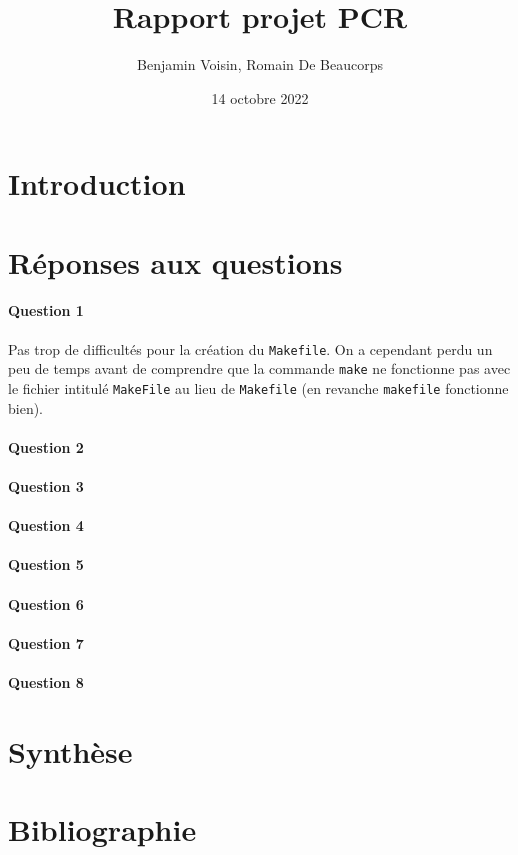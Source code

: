 \documentclass{article}
\title{Rapport projet PCR}
\author{Benjamin Voisin, Romain De Beaucorps}
\date{14 octobre 2022}
\begin{document}
\maketitle

\section{Introduction}

\section{Réponses aux questions}

\paragraph{Question 1} Pas trop de difficultés pour la création du \texttt{Makefile}. On a cependant perdu un peu de temps avant de comprendre que la commande \texttt{make} ne fonctionne pas avec le fichier intitulé \texttt{MakeFile} au lieu de \texttt{Makefile} (en revanche \texttt{makefile} fonctionne bien).

\paragraph{Question 2}


\paragraph{Question 3}

\paragraph{Question 4}

\paragraph{Question 5}

\paragraph{Question 6}

\paragraph{Question 7}

\paragraph{Question 8}

\section{Synthèse}

\section{Bibliographie}
\end{document}
